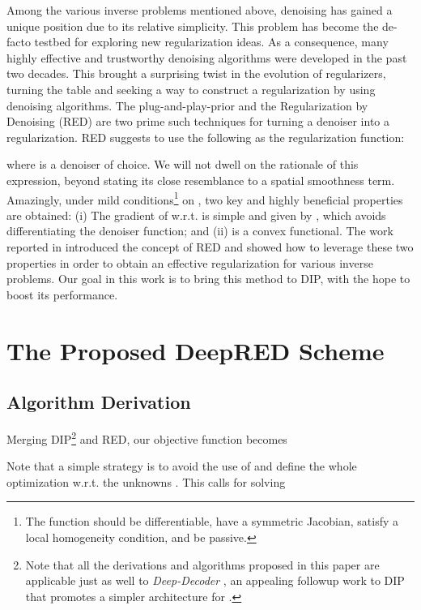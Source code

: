 \documentclass[12pt]{article}
\begin{document}
Among the various inverse problems mentioned above, denoising has gained a unique position due to its relative simplicity. This problem has become the de-facto testbed for exploring new regularization ideas. As a consequence, many highly effective and trustworthy denoising algorithms were developed in the past two decades. This brought a surprising twist in the evolution of regularizers, turning the table and seeking a way to construct a regularization by using denoising algorithms. The plug-and-play-prior \cite{venkatakrishnan2013plug} and the Regularization by Denoising (RED) \cite{RED-2017} are two prime such techniques for turning a denoiser into a regularization. RED suggests to use the following as the regularization function: 

where  is a denoiser of choice. We will not dwell on the rationale of this expression, beyond stating its close resemblance to a spatial smoothness term. Amazingly, under mild conditions\footnote{The function  should be differentiable, have a symmetric Jacobian, satisfy a local homogeneity condition, and be passive.} on ,  two key and highly beneficial properties are obtained: (i) The gradient of  w.r.t.  is simple and given by 
, which avoids differentiating the denoiser function; and (ii)  is a convex functional. The work reported in \cite{RED-2017} introduced the concept of RED and showed how to leverage these two properties in order to obtain an effective regularization for various inverse problems. Our goal in this work is to bring this method to DIP, with the hope to boost its performance. 



\section{The Proposed DeepRED Scheme}
\label{sec:Proposed}

\subsection{Algorithm Derivation}

Merging DIP\footnote{Note that all the derivations and algorithms proposed in this paper are applicable just as well to \emph{Deep-Decoder} \cite{DeepDecoder2019}, an appealing followup work to DIP that promotes a simpler architecture for .} and RED, our objective function becomes 

Note that a simple strategy is to avoid the use of  and define the whole optimization w.r.t. the unknowns . This calls for solving 
\end{document}
